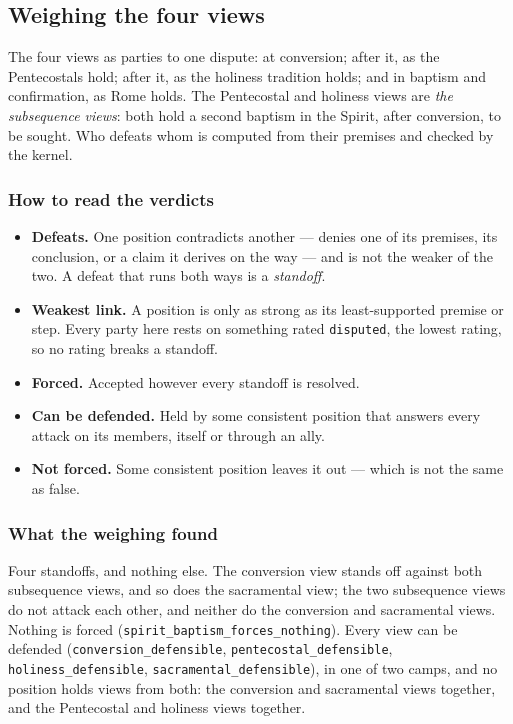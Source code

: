 \documentclass[11pt]{article}
\begin{document}
\subsection*{Weighing the four views}
The four views as parties to one dispute: at conversion; after it, as the Pentecostals hold; after it, as the holiness tradition holds; and in baptism and confirmation, as Rome holds. The Pentecostal and holiness views are \emph{the subsequence views}: both hold a second baptism in the Spirit, after conversion, to be sought. Who defeats whom is computed from their premises and checked by the kernel.

\subsubsection*{How to read the verdicts}
\begin{itemize}
  \item \textbf{Defeats.} One position contradicts another — denies one of its premises, its conclusion, or a claim it derives on the way — and is not the weaker of the two. A defeat that runs both ways is a \emph{standoff}.
  \item \textbf{Weakest link.} A position is only as strong as its least-supported premise or step. Every party here rests on something rated \texttt{disputed}, the lowest rating, so no rating breaks a standoff.
  \item \textbf{Forced.} Accepted however every standoff is resolved.
  \item \textbf{Can be defended.} Held by some consistent position that answers every attack on its members, itself or through an ally.
  \item \textbf{Not forced.} Some consistent position leaves it out — which is not the same as false.
\end{itemize}
\subsubsection*{What the weighing found}
Four standoffs, and nothing else. The conversion view stands off against both subsequence views, and so does the sacramental view; the two subsequence views do not attack each other, and neither do the conversion and sacramental views. Nothing is forced (\texttt{spirit\_\allowbreak{}baptism\_\allowbreak{}forces\_\allowbreak{}nothing}). Every view can be defended (\texttt{conversion\_\allowbreak{}defensible}, \texttt{pentecostal\_\allowbreak{}defensible}, \texttt{holiness\_\allowbreak{}defensible}, \texttt{sacramental\_\allowbreak{}defensible}), in one of two camps, and no position holds views from both: the conversion and sacramental views together, and the Pentecostal and holiness views together.
\end{document}
